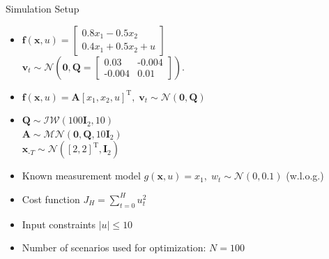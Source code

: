 \documentclass[student, noshadow, itr, english, aspectratio=169]{ITR_LSR_slides}
\begin{document}
\begin{frame}{Simulation Setup}
\begin{itemize}
\item 
{}
$\boldsymbol{f}(\boldsymbol{x}, u) = 
\begin{bmatrix}
0.8  x_1 - 0.5 x_2 \\
0.4 x_1 + 0.5 x_2 + u
\end{bmatrix}$ \\
\makebox[4cm]{\hfill} $\boldsymbol{v}_t \sim \mathcal{N} \left(\boldsymbol{0}, \boldsymbol{Q} =  
\begin{bmatrix}
0.03 & \text{-}0.004 \\
\text{-}0.004 & 0.01
\end{bmatrix}
\right).$

\item 
{} $\boldsymbol{f}(\boldsymbol{x}, u) = \boldsymbol{A} \left[ x_1,  x_2,  u \right]^\text{T}, \; \boldsymbol{v}_{t} \sim \mathcal{N} (\boldsymbol{0}, \boldsymbol{Q})$ 
\item
{} $\boldsymbol{Q} \sim \mathcal{IW} (100 \boldsymbol{I}_2, 10)$ \\
\makebox[4.5cm]{\hfill} $\boldsymbol{A} \sim \mathcal{MN} (\boldsymbol{0}, \boldsymbol{Q}, 10 \boldsymbol{I}_2)\;\;\;\;\;\;\;\;\;\;\;\;\;\;\;\;\;\;$ \cite{Svensson_17}\\
\makebox[4.5cm]{\hfill} $\boldsymbol{x}_{\text{-}T} \sim \mathcal{N} ([2, 2]^\text{T}, \boldsymbol{I}_2)$


\item Known measurement model $g(\boldsymbol{x}, u) = x_1, \; w_t \sim \mathcal{N} (0, 0.1)$ (w.l.o.g.)

\item Cost function $J_H = \sum_{t = 0}^H u_t^2$

\item Input constraints $\left| u \right| \leq 10$



\item Number of scenarios used for optimization: $N = 100$
\end{itemize}
\end{frame}	
\end{document}
